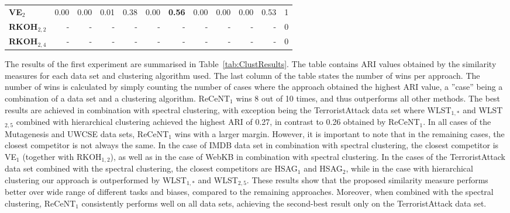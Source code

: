 \begin{table}[t]
{\begin{tabular}[t]{@{}lrrrrrrrrrrr@{}}
	\textbf{VE$_2$}    & 0.00   &  0.00          &   0.01 	 	&  0.38   	  &   0.00  	  & \textbf{0.56}    & 0.00 & 0.00  & 0.00 & 0.53 & 1   \\

	\textbf{RKOH$_{2,2}$}    & -  & -         &  -      	& -         &  - 	 & -   & -  & - 			& -  & - & 0     \\

	\textbf{RKOH$_{2,4}$}    & - & -         &     -   	& -         &  - 	 & -   & -  & - 			&  -  & - & 0   \\
	\bottomrule
\end{tabular}
}

\end{table}



The results of the first experiment are summarised in Table~\ref{tab:ClustResults}.
The table contains ARI values obtained by the similarity measures for each data set and clustering algorithm used.
The last column of the table states the number of wins per approach.
The number of wins is calculated by simply counting the number of cases where the approach obtained the highest ARI value, a ''case'' being a combination of a data set and a clustering algorithm.
ReCeNT$_1$ wins 8 out of 10 times, and thus outperforms all other methods.
The best results are achieved in combination with spectral clustering, with exception being the TerroristAttack data set where WLST$_{1,*}$ and WLST$_{2,5}$ combined with hierarchical clustering achieved the highest ARI of 0.27, in contrast to 0.26 obtained by ReCeNT$_1$.
In all cases of the Mutagenesis and UWCSE data sets, ReCeNT$_1$ wins with a larger margin.
However, it is important to note that in the remaining cases, the closest competitor is not always the same.
In the case of IMDB data set in combination with spectral clustering, the closest competitor is VE$_1$ (together with RKOH$_{1,2}$), as well as in the case of WebKB in combination with spectral clustering.
In the cases of the TerroristAttack data set combined with the spectral clustering, the closest competitors are HSAG$_1$ and HSAG$_2$, while in the case with hierarchical clustering our approach is outperformed by WLST$_{1,*}$ and WLST$_{2,5}$.
These results show that the proposed similarity measure performs better over wide range of different tasks and biases, compared to the remaining approaches.
Moreover, when combined with the spectral clustering, ReCeNT$_1$ consistently performs well on all data sets, achieving the second-best result only on the TerroristAttack data set.



